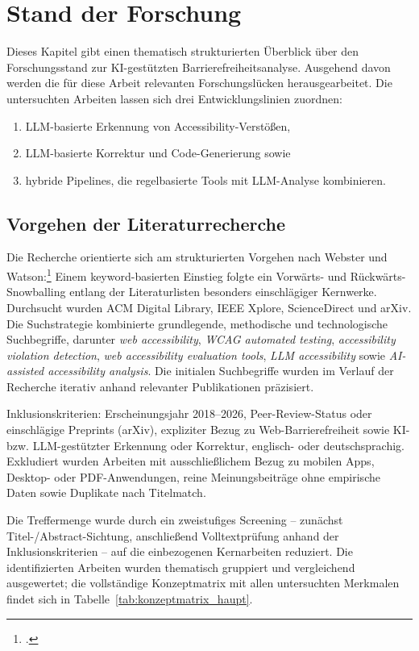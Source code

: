 \chapter{Stand der Forschung} \label{kap:3}

Dieses Kapitel gibt einen thematisch strukturierten Überblick über den Forschungsstand zur \acs{KI}-gestützten Barrierefreiheitsanalyse. Ausgehend davon werden die für diese Arbeit relevanten Forschungslücken herausgearbeitet. Die untersuchten Arbeiten lassen sich drei Entwicklungslinien zuordnen:
\begin{enumerate}
  \item \ac{LLM}-basierte Erkennung von Accessibility-Verstößen,
  \item \ac{LLM}-basierte Korrektur und Code-Generierung sowie
  \item hybride Pipelines, die regelbasierte Tools mit \ac{LLM}-Analyse kombinieren.
\end{enumerate}
\section{Vorgehen der Literaturrecherche}

Die Recherche orientierte sich am strukturierten Vorgehen nach Webster und Watson:\footcite[Vgl.][]{WebsterWatson2002} Einem keyword-basierten Einstieg folgte ein Vorwärts- und Rückwärts-Snowballing entlang der Literaturlisten besonders einschlägiger Kernwerke. Durchsucht wurden ACM Digital Library, IEEE Xplore, ScienceDirect und arXiv. Die Suchstrategie kombinierte grundlegende, methodische und technologische Suchbegriffe, darunter \textit{\glqq web accessibility\grqq}, \textit{\glqq WCAG automated testing\grqq}, \textit{\glqq accessibility violation detection\grqq}, \textit{\glqq web accessibility evaluation tools\grqq}, \textit{\glqq LLM accessibility\grqq} sowie \textit{\glqq AI-assisted accessibility analysis\grqq}. Die initialen Suchbegriffe wurden im Verlauf der Recherche iterativ anhand relevanter Publikationen präzisiert.

Inklusionskriterien: Erscheinungsjahr 2018--2026, Peer-Review-Status oder einschlägige Preprints (arXiv), expliziter Bezug zu Web-Barrierefreiheit sowie \acs{KI}- bzw. \acs{LLM}-gestützter Erkennung oder Korrektur, englisch- oder deutschsprachig. Exkludiert wurden Arbeiten mit ausschließlichem Bezug zu mobilen Apps, Desktop- oder PDF-Anwendungen, reine Meinungsbeiträge ohne empirische Daten sowie Duplikate nach Titelmatch.

Die Treffermenge wurde durch ein zweistufiges Screening -- zunächst Titel-/Abstract-Sichtung, anschließend Volltextprüfung anhand der Inklusionskriterien -- auf die einbezogenen Kernarbeiten reduziert. Die identifizierten Arbeiten wurden thematisch gruppiert und vergleichend ausgewertet; die vollständige Konzeptmatrix mit allen untersuchten Merkmalen findet sich in Tabelle~\ref{tab:konzeptmatrix_haupt}.

